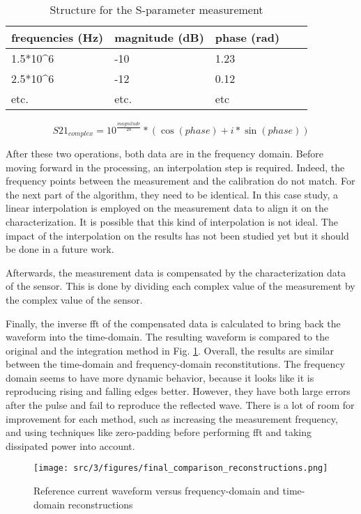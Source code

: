 \begin{table}[!h]
  \centering
  \begin{tabular}{@{}lllll@{}}
  \toprule
  frequencies (Hz)          & magnitude (dB)         & phase (rad)     \\ \midrule
  1.5*10^6                  & -10                    & 1.23            \\
  2.5*10^6                  & -12                    & 0.12            \\
  etc.                      & etc.                   & etc             \\ \bottomrule
  \end{tabular}
  \caption{Structure for the S-parameter measurement}
  \label{tab:sparams}
\end{table}

\begin{equation} \label{eq:to-complex}
  S21_{complex} = 10^{\frac{magnitude}{20}} * (\cos(phase) + i*\sin(phase))
\end{equation}

After these two operations, both data are in the frequency domain.
Before moving forward in the processing, an interpolation step is required.
Indeed, the frequency points between the measurement and the calibration do not match.
For the next part of the algorithm, they need to be identical.
In this case study, a linear interpolation is employed on the measurement data to align it on the characterization.
It is possible that this kind of interpolation is not ideal.
The impact of the interpolation on the results has not been studied yet but it should be done in a future work.

Afterwards, the measurement data is compensated by the characterization data of the sensor.
This is done by dividing each complex value of the measurement by the complex value of the sensor.

Finally, the inverse \gls{fft} of the compensated data is calculated to bring back the waveform into the time-domain.
The resulting waveform is compared to the original and the integration method in Fig. \ref{fig:freq-domain-reconstructed}.
Overall, the results are similar between the time-domain and frequency-domain reconstitutions.
The frequency domain seems to have more dynamic behavior, because it looks like it is reproducing rising and falling edges better.
However, they have both large errors after the pulse and fail to reproduce the reflected wave.
There is a lot of room for improvement for each method, such as increasing the measurement frequency, and using techniques like zero-padding before performing \gls{fft} and taking dissipated power into account.

\begin{figure}[!h]
  \centering
  \texttt{[image: src/3/figures/final\_comparison\_reconstructions.png]}
  \caption{Reference current waveform versus frequency-domain and time-domain reconstructions}
  \label{fig:freq-domain-reconstructed}
\end{figure}
